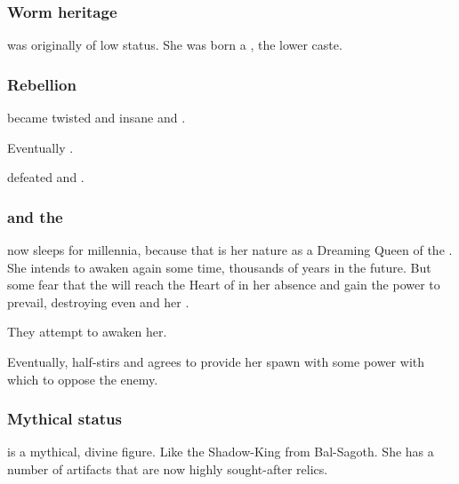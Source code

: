 \subsubsection{Worm heritage}
\Tiamat was originally of low status. 
She was born a , the \Caisith lower caste.





\subsubsection{Rebellion}
\Tiamat became twisted and insane and . 

Eventually \Tiamat {}. 

\Sethicus defeated \Tiamat and .





\subsubsection{\Xserasshana{} and the \firstgendragons}
\Tiamat{} now sleeps for millennia, 
because that is her nature as a Dreaming Queen of the \ophidians{}. She intends to awaken again some time, thousands of years in the future. But some \dragons{} fear that the \banes{} will reach the Heart of \Miith{} in her absence and gain the power to prevail, destroying even \Tiamat{} and her \firstgendragons. 

They attempt to awaken her.

Eventually, \Tiamat{} half-stirs and agrees to provide her spawn with some power with which to oppose the enemy. 





\subsubsection{Mythical status}
\Tiamat{} is a mythical, divine figure. 
Like the Shadow-King from Bal-Sagoth. 
She has a number of artifacts that are now highly sought-after relics. 






